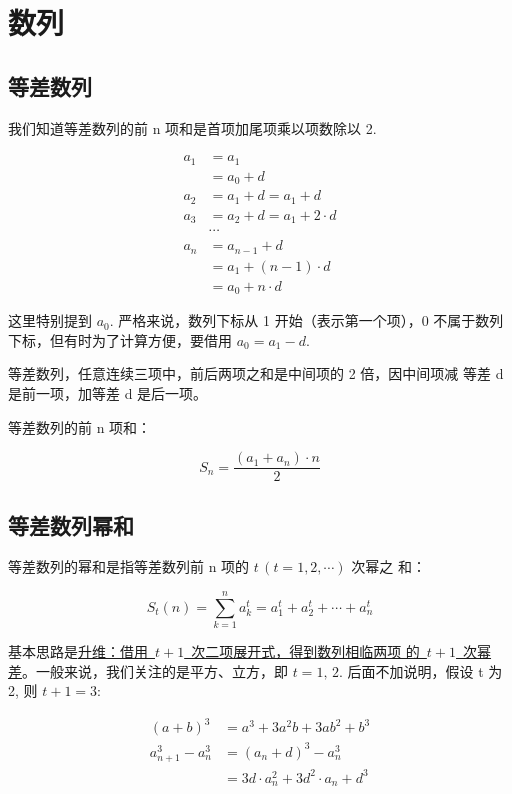 \chapter{数列}
\label{cha:seq-num}

\section{等差数列}

我们知道等差数列的前 n 项和是首项加尾项乘以项数除以 2.

\[
  \begin{aligned}
    a_1 &= a_1 \\
    &= a_0 + d \\
    a_2 &= a_1 + d = a_1 + d \\
    a_3 &= a_2 + d = a_1 + 2 \cdot d \\
    & \cdots \\
    a_n &= a_{n-1} + d \\
    &= a_1 + (n - 1) \cdot d \\
    &= a_0 + n \cdot d
  \end{aligned}
\]

这里特别提到 $a_0$. 严格来说，数列下标从 1 开始（表示第一个项），0
不属于数列下标，但有时为了计算方便，要借用 $a_0 = a_1 - d$.

等差数列，任意连续三项中，前后两项之和是中间项的 2 倍，因中间项减
等差 d 是前一项，加等差 d 是后一项。

等差数列的前 n 项和：

\[
  S_n = \frac{(a_1 + a_n) \cdot n}{2}
\]

\section{等差数列幂和}

等差数列的幂和是指等差数列前 n 项的 $t\, (t = 1,2,\cdots)$ 次幂之
和：

\[
  S_t(n) = \sum_{k = 1}^n a_k^t = a_1^t + a_2^t + \cdots + a_n^t
\]

基本思路是\uline{升维：借用~$ t + 1$~次二项展开式，得到数列相临两项
  的~$t + 1$~次幂差}。一般来说，我们关注的是平方、立方，即 $t =
1,\, 2$. 后面不加说明，假设 t 为 2, 则 $t + 1 = 3$:

\[
  \begin{aligned}
    (a + b)^3 &= a^3 + 3a^2b + 3ab^2 + b^3 \\
    a_{n+1}^3 - a_n^3 &= (a_n + d)^3 - a_n^3 \\
    &= 3d \cdot a_n^2 + 3d^2 \cdot a_n + d^3
  \end{aligned}
\]

